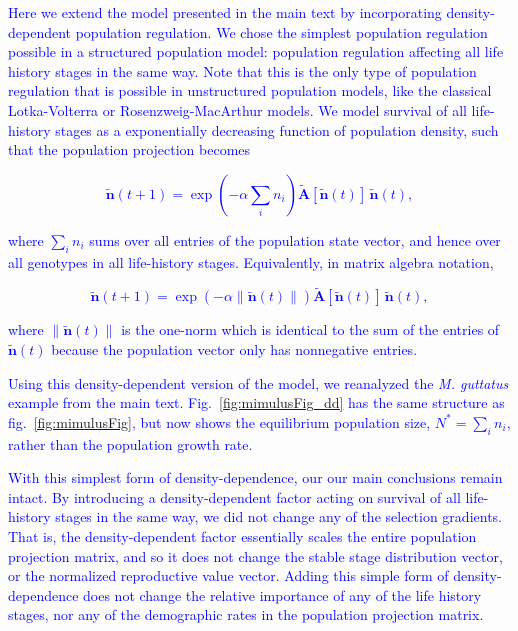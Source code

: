 \documentclass[11pt]{article}
\def\mbf#1{\mathbf{#1}}
\begin{document}
\textcolor{blue}{Here we extend the model presented in the main text by incorporating density-dependent population regulation. We chose the simplest population regulation possible in a structured population model: population regulation affecting all life history stages in the same way. Note that this is the only type of population regulation that is possible in unstructured population models, like the classical Lotka-Volterra or Rosenzweig-MacArthur models. We model survival of all life-history stages as a exponentially decreasing function of population density, such that the population projection becomes
\begin{linenomath*}
\begin{equation}
	\tilde{\mbf{n}}(t + 1) = \exp\left(-\alpha \sum_i n_i \right) \tilde{\mbf{A}}[\tilde{\mbf{n}}(t)] \, \tilde{\mbf{n}}(t),
\end{equation}
\end{linenomath*}
where $\sum_i n_i$ sums over all entries of the population state vector, and hence over all genotypes in all life-history stages. Equivalently, in matrix algebra notation,
\begin{linenomath*}
\begin{equation}
	\tilde{\mbf{n}}(t + 1) = \exp\left(-\alpha \| \tilde{\mbf{n}}(t) \|\right) \tilde{\mbf{A}}[\tilde{\mbf{n}}(t)] \, \tilde{\mbf{n}}(t),
\end{equation}
\end{linenomath*}
where $\| \tilde{\mbf{n}}(t) \|$ is the one-norm which is identical to the sum of the entries of $\tilde{\mbf{n}}(t)$ because the population vector only has nonnegative entries. }

\textcolor{blue}{Using this density-dependent version of the model, we reanalyzed the {\itshape M. guttatus} example from the main text. Fig.~\ref{fig:mimulusFig_dd} has the same structure as fig.~\ref{fig:mimulusFig}, but now shows the equilibrium population size, $N^{\ast} = \sum_i n_i $, rather than the population growth rate. }

\textcolor{blue}{With this simplest form of density-dependence, our our main conclusions remain intact. By introducing a density-dependent factor acting on survival of all life-history stages in the same way, we did not change any of the selection gradients. That is, the density-dependent factor essentially scales the entire population projection matrix, and so it does not change the stable stage distribution vector, or the normalized reproductive value vector. Adding this simple form of density-dependence does not change the relative importance of any of the life history stages, nor any of the demographic rates in the population projection matrix. }
\end{document}

